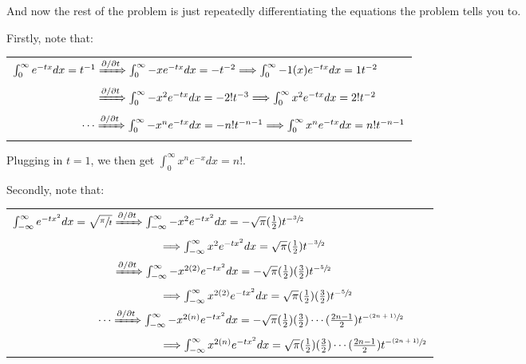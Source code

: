 \documentclass{book}
\newenvironment{myIndent}{%
   \begin{adjustwidth}{2.5em}{0em}%
}{%
   \end{adjustwidth}%
}
\newcommand{\retTwo}{\hfill\bigbreak}
\begin{document}
\begin{myIndent}
	And now the rest of the problem is just repeatedly differentiating the equations the problem tells you to.


	\newpage

	Firstly, note that:

	{\centering\begin{tabular}{l}
		$\int_0^\infty e^{-tx}dx = t^{-1} \xRightarrow{\partial / \partial t} \int_0^\infty -xe^{-tx}dx = -t^{-2} \Longrightarrow \int_0^\infty -1(x)e^{-tx}dx = 1t^{-2}$ \\
		$\phantom{\int_0^\infty e^{-tx}dx = t^{-1}} \xRightarrow{\partial / \partial t} \int_0^\infty -x^2e^{-tx}dx = -2!t^{-3} \Longrightarrow \int_0^\infty x^2e^{-tx}dx = 2!t^{-2}$\\
		$\phantom{\int_0^\infty e^{-tx}dxaa.} \cdots \xRightarrow{\partial / \partial t} \int_0^\infty -x^ne^{-tx}dx = -n!t^{-n-1} \Longrightarrow \int_0^\infty x^ne^{-tx}dx = n!t^{-n-1}$
	\end{tabular}\retTwo\par}

	Plugging in $t = 1$, we then get $\int_0^\infty x^n e^{-x}dx = n!$.\retTwo

	Secondly, note that:

	{\centering\begin{tabular}{l}
		$\int_{-\infty}^\infty e^{-tx^2}dx = \sqrt{\sfrac{\pi}{t}} \xRightarrow{\partial / \partial t} \int_{-\infty}^\infty -x^2e^{-tx^2}dx = -\sqrt{\pi}(\frac{1}{2})t^{-\sfrac{3}{2}}$\\
		$\phantom{\int_{-\infty}^\infty e^{-tx^2}dx = \sqrt{\sfrac{\pi}{t}}a aaaaaaa} \Longrightarrow \int_{-\infty}^\infty x^2e^{-tx^2}dx = \sqrt{\pi}(\frac{1}{2})t^{-\sfrac{3}{2}}$ \\

		$\phantom{\int_{-\infty}^\infty e^{-tx^2}dx = \sqrt{\sfrac{\pi}{t}}} \xRightarrow{\partial / \partial t} \int_{-\infty}^\infty -x^{2(2)}e^{-tx^2}dx = -\sqrt{\pi}(\frac{1}{2})(\frac{3}{2})t^{-\sfrac{5}{2}}$\\
		$\phantom{\int_{-\infty}^\infty e^{-tx^2}dx = \sqrt{\sfrac{\pi}{t}}a aaaaaaa} \Longrightarrow \int_{-\infty}^\infty x^{2(2)}e^{-tx^2}dx = \sqrt{\pi}(\frac{1}{2})(\frac{3}{2})t^{-\sfrac{5}{2}}$ \\

		$\phantom{\int_{-\infty}^\infty e^{-tx}dxaa aa.} \cdots \xRightarrow{\partial / \partial t} \int_{-\infty}^\infty -x^{2(n)}e^{-tx^2}dx = -\sqrt{\pi}(\frac{1}{2})(\frac{3}{2})\cdots(\frac{2n-1}{2})t^{-\sfrac{(2n+1)}{2}}$\\
		$\phantom{\int_{-\infty}^\infty e^{-tx^2}dx = \sqrt{\sfrac{\pi}{t}}a aaaaaaa} \Longrightarrow \int_{-\infty}^\infty x^{2(n)}e^{-tx^2}dx = \sqrt{\pi}(\frac{1}{2})(\frac{3}{2})\cdots (\frac{2n-1}{2})t^{-\sfrac{(2n+1)}{2}}$ \\
	\end{tabular}\retTwo\par}


\end{myIndent}
\end{document}
